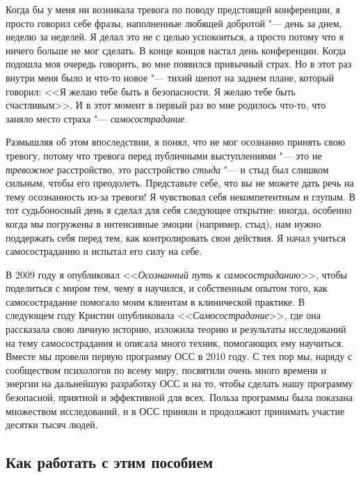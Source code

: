 	Когда бы у меня ни возникала тревога по поводу предстоящей конференции, я просто говорил себе фразы, наполненные любящей добротой "--- день за днем, неделю за неделей. Я делал это не с целью успокоиться, а просто потому что я ничего больше не мог сделать. В конце концов настал день конференции. Когда подошла моя очередь говорить, во мне появился привычный страх. Но в этот раз внутри меня было и что-то новое "--- тихий шепот на заднем плане, который говорил: <<Я желаю тебе быть в безопасности. Я желаю тебе быть счастливым>>. И в этот момент в первый раз во мне родилось что-то, что заняло место страха "--- \emph{самосострадание}.
	
	Размышляя об этом впоследствии, я понял, что не мог осознанно принять свою тревогу, потому что тревога перед публичными выступлениями "--- это не \emph{тревожное} расстройство, это расстройство \emph{стыда} "--- и стыд был слишком сильным, чтобы его преодолеть. Представьте себе, что вы не можете дать речь на тему осознанность из-за тревоги! Я чувствовал себя некомпетентным и глупым. В тот судьбоносный день я сделал для себя следующее открытие: иногда, особенно когда мы погружены в интенсивные эмоции (например, стыд), нам нужно поддержать себя перед тем, как контролировать свои действия. Я начал учиться самосостраданию и испытал его силу на себе.
	
	В 2009 году я опубликовал <<\emph{Осознанный путь к самосостраданию}>>, чтобы поделиться с миром тем, чему я научился, и собственным опытом того, как самосострадание помогало моим клиентам в клинической практике. В следующем году Кристин опубликовала <<\emph{Самосострадание}>>, где она рассказала свою личную историю, изложила теорию и результаты исследований на тему самосострадания и описала много техник, помогающих ему научиться. Вместе мы провели первую программу ОСС в 2010 году. С тех пор мы, наряду с сообществом психологов по всему миру, посвятили очень много времени и энергии на дальнейшую разработку ОСС и на то, чтобы сделать нашу программу безопасной, приятной и эффективной для всех. Польза программы была показана множеством исследований, и в ОСС приняли и продолжают принимать участие десятки тысяч людей. 
	
	
	\subsection{Как работать с этим пособием}
	
